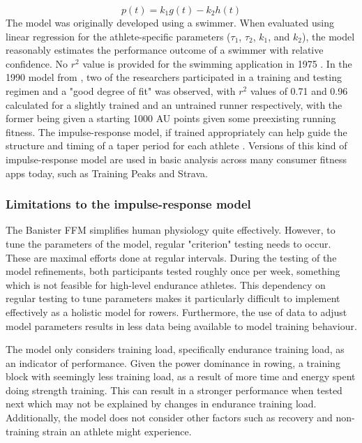 \begin{equation}\label{eq:ban_perf}
  p(t) = k_1g(t)-k_2h(t)
\end{equation}
The model was originally developed using a swimmer. When evaluated using linear regression for the athlete-specific parameters ($\tau_1$, $\tau_2$, $k_1$, and $k_2$), the model reasonably estimates the performance outcome of a swimmer with relative confidence. No $r^2$ value is provided for the swimming application in 1975 \cite{Bannister1976}. In the 1990 model from \textcite{Morton1990}, two of the researchers participated in a training and testing regimen and a "good degree of fit" was observed, with $r^2$ values of 0.71 and 0.96 calculated for a slightly trained and an untrained runner respectively, with the former being given a starting 1000 AU points given some preexisting running fitness. The impulse-response model, if trained appropriately can help guide the structure and timing of a taper period for each athlete \cite{Morton1990}.
Versions of this kind of impulse-response model are used in basic analysis across many consumer fitness apps today, such as Training Peaks and Strava.

\subsubsection{Limitations to the impulse-response model}
The Banister FFM simplifies human physiology quite effectively. However, to tune the parameters of the model, regular "criterion" testing needs to occur. These are maximal efforts done at regular intervals. During the testing of the \textcite{Morton1990} model refinements, both participants tested roughly once per week, something which is not feasible for high-level endurance athletes. This dependency on regular testing to tune parameters makes it particularly difficult to implement effectively as a holistic model for rowers. Furthermore, the use of data to adjust model parameters results in less data being available to model training behaviour.

The model only considers training load, specifically endurance training load, as an indicator of performance. Given the power dominance in rowing, a training block with seemingly less training load, as a result of more time and energy spent doing strength training. This can result in a stronger performance when tested next which may not be explained by changes in endurance training load. Additionally, the model does not consider other factors such as recovery and non-training strain an athlete might experience.

